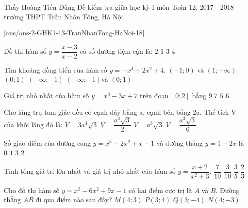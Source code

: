 \begin{name}
{Thầy Hoàng Tiến Dũng}
{Đề kiểm tra giữa học kỳ I môn Toán 12, 2017 - 2018 trường THPT Trần Nhân Tông, Hà Nội}
\end{name}
\setcounter{ex}{0}
[ans/ans-2-GHK1-13-TranNhanTong-HaNoi-18]



\begin{ex}%
	Đồ thị hàm số $y=\dfrac{x-3}{x-2}$ có số đường tiệm cận là:
	\choice
	{\True $2$}
	{$1$}
	{$3$}
	{$4$}
\end{ex}
\begin{ex}%
	Tìm khoảng đồng biến của hàm số $y=-{{x}^{4}}+2{{x}^{2}}+4.$ 
	\choice
	{$\left( -1;0 \right)$ và $\left( 1;+\infty \right)$}
	{$\left( 0;1 \right)$}
	{$\left( -\infty ;-1 \right)$}
	{\True $\left( -\infty ;-1 \right)$và $\left( 0;1 \right)$}
\end{ex}

\begin{ex}%
	Giá trị nhỏ nhất của hàm số $y={{x}^{3}}-3x+7$ trên đoạn $\left[ 0;2 \right]$ bằng
	\choice
	{\True $9$}
	{$7$}
	{$5$}
	{$6$}
\end{ex}
\begin{ex}%
	Cho lăng trụ tam giác đều có cạnh đáy bằng a, cạnh bên bằng 2a. Thể tích V của khối lăng đó là:
	\choice
	{$V=3{{a}^{3}}\sqrt{3}$}
	{\True $V=\dfrac{{{a}^{3}}\sqrt{3}}{2}$}
	{$V={{a}^{3}}\sqrt{3}$}
	{$V=\dfrac{{{a}^{3}}\sqrt{3}}{6}$}
\end{ex}
\begin{ex}%
	Số giao điểm của đường cong $y={{x}^{3}}-2{{x}^{2}}+x-1$ và đường thẳng $y=1-2x$ là
	\choice
	{$0$}
	{\True $1$}
	{$3$}
	{$2$}
\end{ex}
\begin{ex}%
	
	Tính tổng giá trị lớn nhất và giá trị nhỏ nhất của hàm số $y=\dfrac{x+2}{{{x}^{2}}+3}$. 
	\choice
	{$\dfrac{7}{10}$}
	{ $\dfrac{3}{10}$}
	{$\dfrac{3}{5}$}
	{\True$\dfrac{2}{3}$}
\end{ex}
\begin{ex}%
	Cho đồ thị hàm số  $y={{x}^{3}}-6{}{{x}^{2}}+9x-1$  có hai điểm cực trị là $A$ và $B$. Đường thẳng $AB$ đi qua điểm nào sau đây?
	\choice
	{$M(4;3)$}
	{$P(3;4)$}
	{$Q(3;-4)$}
	{\True $N(4;-3)$}
\end{ex}

